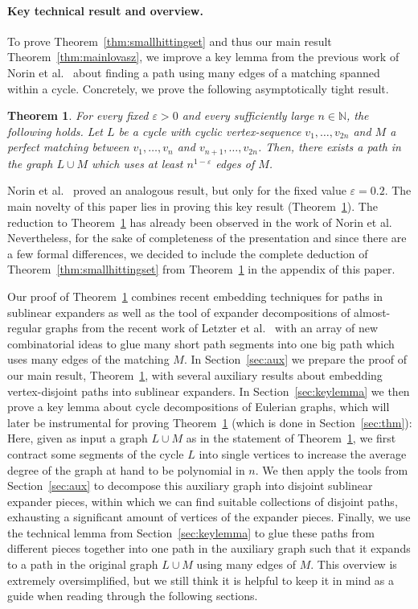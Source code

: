 \documentclass[11pt,reqno]{article}
\newtheorem{theorem}{Theorem}[section]
\begin{document}
\paragraph*{\textbf{Key technical result and overview.}} 

To prove Theorem~\ref{thm:smallhittingset} and thus our main result Theorem~\ref{thm:mainlovasz}, we improve a key lemma from the previous work of Norin et al.~\cite{norin} about finding a path using many edges of a matching spanned within a cycle. Concretely, we prove the following asymptotically tight result.

\begin{theorem}\label{thm: main}
    For every fixed $\varepsilon>0$ and every sufficiently large $n\in\mathbb{N}$, the following holds. Let $L$ be a cycle with cyclic vertex-sequence $v_1,\ldots,v_{2n}$ and $M$ a perfect matching between $v_1,\ldots,v_n$ and $v_{n+1},\ldots,v_{2n}$. Then, there exists a path in the graph $L\cup M$ which uses at least $n^{1-\varepsilon}$ edges of $M$.
\end{theorem}

Norin et al.~\cite[Lemma 8]{norin} proved an analogous result, but only for the fixed value $\varepsilon=0.2$. The main novelty of this paper lies in proving this key result (Theorem~\ref{thm: main}). The reduction to Theorem~\ref{thm: main} has already been observed in the work of Norin et al. Nevertheless, for the sake of completeness of the presentation and since there are a few formal differences, we decided to include the complete deduction of Theorem~\ref{thm:smallhittingset} from Theorem~\ref{thm: main} in the appendix of this paper. 

Our proof of Theorem~\ref{thm: main} combines recent embedding techniques for paths in sublinear expanders as well as the tool of expander decompositions of almost-regular graphs from the recent work of Letzter et al.~\cite{expanders} with an array of new combinatorial ideas to glue many short path segments into one big path which uses many edges of the matching $M$. In Section~\ref{sec:aux} we prepare the proof of our main result, Theorem~\ref{thm: main}, with several auxiliary results about embedding vertex-disjoint paths into sublinear expanders. In Section~\ref{sec:keylemma} we then prove a key lemma about cycle decompositions of Eulerian graphs, which will later be instrumental for proving Theorem~\ref{thm: main} (which is done in Section~\ref{sec:thm}): Here, given as input a graph $L\cup M$ as in the statement of Theorem~\ref{thm: main}, we first contract some segments of the cycle $L$ into single vertices to increase the average degree of the graph at hand to be polynomial in $n$. We then apply the tools from Section~\ref{sec:aux} to decompose this auxiliary graph into disjoint sublinear expander pieces, within which we can find suitable collections of disjoint paths, exhausting a significant amount of vertices of the expander pieces. Finally, we use the technical lemma from Section~\ref{sec:keylemma} to glue these paths from different pieces together into one path in the auxiliary graph such that it expands to a path in the original graph $L\cup M$ using many edges of $M$. This overview is extremely oversimplified, but we still think it is helpful to keep it in mind as a guide when reading through the following sections.
\end{document}

